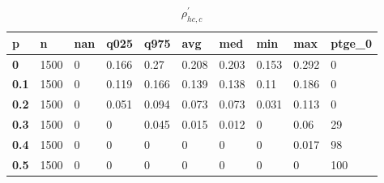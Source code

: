 \begin{table}[h]
 \centering 
\footnotesize
\caption{$\rho_{hc,c}^\prime $}
\label{tab:alphahcc}
\begin{tabular}[h]{|l|l|l|l|l|l|l|l|l|l|
    } \hline
\textbf{ p} & \textbf{ n} & \textbf{ nan} & \textbf{ q025} & \textbf{ q975} & \textbf{ avg} & \textbf{ med} & \textbf{ min} & \textbf{ max} & \textbf{ ptge\_0}
    \\ \hline
  \textbf{  0} & 1500 & 0 & 0.166 &  0.27 & 0.208 & 0.203 & 0.153 & 0.292 &   0
    \\ \hline
  \textbf{0.1} & 1500 & 0 & 0.119 & 0.166 & 0.139 & 0.138 &  0.11 & 0.186 &   0
    \\ \hline
  \textbf{0.2} & 1500 & 0 & 0.051 & 0.094 & 0.073 & 0.073 & 0.031 & 0.113 &   0
    \\ \hline
  \textbf{0.3} & 1500 & 0 &     0 & 0.045 & 0.015 & 0.012 &     0 &  0.06 &  29
    \\ \hline
  \textbf{0.4} & 1500 & 0 &     0 &     0 &     0 &     0 &     0 & 0.017 &  98
    \\ \hline
  \textbf{0.5} & 1500 & 0 &     0 &     0 &     0 &     0 &     0 &     0 & 100
    \\ \hline
 \end{tabular}
 \end{table}
